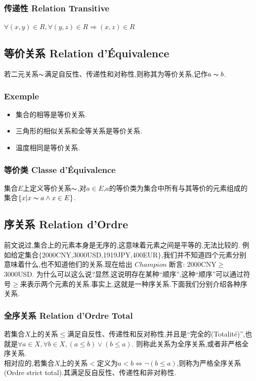 \documentclass[12pt, a4paper, oneside]{ctexbook}
\begin{document}
  \subsubsection{传递性  Relation Transitive}
  $\forall(x,y)\in R,\forall (y,z)\in R\Rightarrow(x,z)\in R$
  \subsection{等价关系 Relation d'Équivalence}
  若二元关系$\thicksim $满足自反性、传递性和对称性,则称其为等价关系,记作$a\thicksim b$.
  \subsubsection{Exemple}
  \begin{itemize}
    \item 集合的相等是等价关系.
    \item 三角形的相似关系和全等关系是等价关系.
    \item 温度相同是等价关系.
  \end{itemize}
  \subsubsection{等价类 Classe d'Équivalence}
  集合$E$上定义等价关系$\thicksim $,对$a\in E$,$a$的等价类为集合中所有与其等价的元素组成的集合$\{x|x\thicksim a\land x\in E\}$.
  
  \subsection{序关系 Relation d'Ordre}
  前文说过,集合上的元素本身是无序的,这意味着元素之间是平等的,无法比较的.
  例如给定集合$\{$2000CNY,3000USD,1919JPY,400EUR$\}$,我们并不知道四个元素分别意味着什么,也不知道他们的关系.现在给出 $Champion$ 断言: 2000CNY$\ge$3000USD.
  为什么可以这么说?显然,这说明存在某种“顺序”,这种“顺序”可以通过符号$\ge$来表示两个元素的关系.事实上,这就是一种序关系.下面我们分别介绍各种序关系.
  \subsubsection{全序关系 Relation d'Ordre Total}
  若集合$X$上的关系$\leq$满足自反性、传递性和反对称性,并且是“完全的(Totalité)”,也就是$\forall a\in X,\forall b\in X,(a\leq b)\lor(b\leq a)$.
  则称此关系为全序关系,或者非严格全序关系.\\
  
  相对应的,若集合$X$上的关系$<$定义为$a<b\Leftrightarrow \lnot(b\leq a)$,则称为严格全序关系(Ordre strict total).其满足反自反性、传递性和非对称性.
\end{document}
